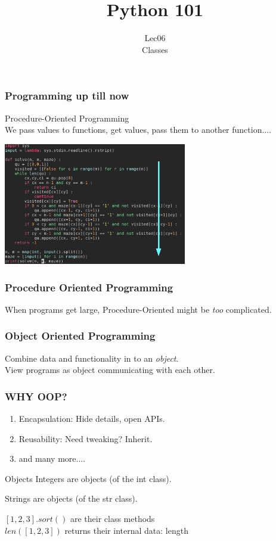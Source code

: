 \documentclass{beamer}
\title{Python 101}
\subtitle{Lec06 \\ Classes}
\begin{document}
\frame{\titlepage}

\begin{frame}
\frametitle{Programming up till now}
Procedure-Oriented Programming\\
We pass values to functions, get values, pass them to another function....
  \begin{center}
  \includegraphics[width=80mm]{./code.png}
  \end{center}
\end{frame}

\begin{frame}
\frametitle{Procedure Oriented Programming}
  When programs get large, Procedure-Oriented might be \textit{too}
  complicated.\\
\end{frame}

\begin{frame}
\frametitle{Object Oriented Programming}
  Combine data and functionality in to an \textit{object}.\\
  View programs as object communicating with each other.
\end{frame}

\begin{frame}
\frametitle{WHY OOP?}
\begin{enumerate}
  \item Encapsulation: Hide details, open APIs.
  \item Reusability: Need tweaking? Inherit.
  \item and many more....
\end{enumerate}
\end{frame}

\begin{frame}{Objects}
  Integers are objects (of the int class).

  Strings are objects (of the str class).

  $[1,2,3].sort()$ are their class methods\\
  $len([1,2,3])$ returns their internal data: length
\end{frame}
\end{document}
